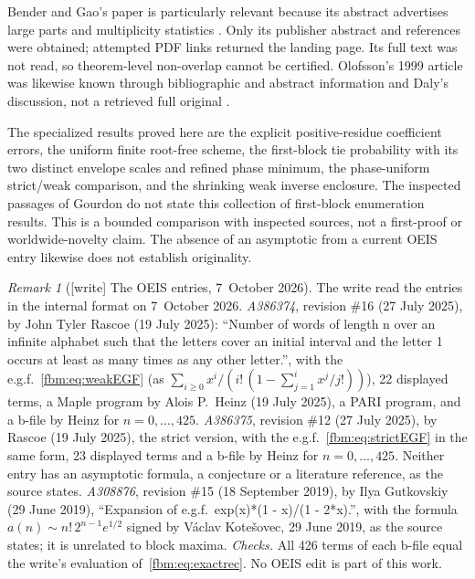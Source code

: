 \documentclass[11pt]{article}
\theoremstyle{remark}\newtheorem{remark}[theorem]{Remark}
\begin{document}
Bender and Gao's paper is particularly relevant because its abstract advertises large parts and multiplicity statistics \cite{bendergao}. Only its publisher abstract and references were obtained; attempted PDF links returned the landing page. Its full text was not read, so theorem-level non-overlap cannot be certified. Olofsson's 1999 article was likewise known through bibliographic and abstract information and Daly's discussion, not a retrieved full original \cite{olofsson}.

The specialized results proved here are the explicit positive-residue coefficient errors, the uniform finite root-free scheme, the first-block tie probability with its two distinct envelope scales and refined phase minimum, the phase-uniform strict/weak comparison, and the shrinking weak inverse enclosure. The inspected passages of Gourdon do not state this collection of first-block enumeration results. This is a bounded comparison with inspected sources, not a first-proof or worldwide-novelty claim. The absence of an asymptotic from a current OEIS entry likewise does not establish originality.

\begin{remark}[{[write]} The OEIS entries, 7~October 2026]\label{fbm:rem:oeis}
The write read the entries in the internal format on 7~October 2026.
\emph{A386374}, revision \#16 (27 July 2025), by John Tyler Rascoe (19 July
2025): ``Number of words of length n over an infinite alphabet such that the
letters cover an initial interval and the letter 1 occurs at least as many
times as any other letter.'', with the e.g.f.\ \eqref{fbm:eq:weakEGF} (as
$\sum_{i\ge0}x^i/(i!\,(1-\sum_{j=1}^ix^j/j!))$), 22 displayed terms, a Maple
program by Alois P.\ Heinz (19 July 2025), a PARI program, and a b-file by
Heinz for $n=0,\ldots,425$. \emph{A386375}, revision \#12 (27 July 2025), by
Rascoe (19 July 2025), the strict version, with the e.g.f.\
\eqref{fbm:eq:strictEGF} in the same form, 23 displayed terms and a b-file by
Heinz for $n=0,\ldots,425$. Neither entry has an asymptotic formula, a
conjecture or a literature reference, as the source states. \emph{A308876},
revision \#15 (18 September 2019), by Ilya Gutkovskiy (29 June 2019),
``Expansion of e.g.f.\ exp(x)*(1 - x)/(1 - 2*x).'', with the formula
$a(n)\sim n!\,2^{n-1}e^{1/2}$ signed by V\'aclav Kote\v{s}ovec, 29 June 2019,
as the source states; it is unrelated to block maxima. \emph{Checks.} All 426
terms of each b-file equal the write's evaluation
of~\eqref{fbm:eq:exactrec}. No OEIS edit is part of this work.
\end{remark}
\end{document}
